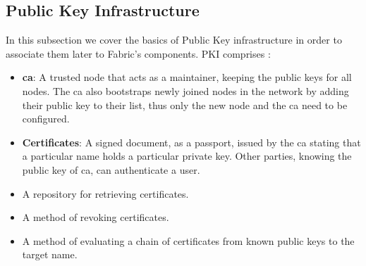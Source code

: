 \subsection{Public Key Infrastructure}
In this subsection we cover the basics of Public Key infrastructure in order to associate them later to Fabric's components. 
PKI comprises \cite{CertificatesPKI} :
\begin{itemize}
    \item \textbf{\acrfull{ca}}: A trusted node that acts as a maintainer, keeping the public keys for all nodes. The \acrshort{ca} also bootstraps newly joined nodes in the network by adding their public key to their list, thus only the new node and the \acrshort{ca} need to be configured. 
    \item \textbf{Certificates}: A signed document, as a passport, issued by the \acrshort{ca} stating that a particular name holds a particular private key. Other parties, knowing the public key of \acrshort{ca}, can authenticate a user.  
    \item A repository for retrieving certificates.
    \item A method of revoking certificates.
    \item A method of evaluating a chain of certificates from known public keys to the target name.
\end{itemize}